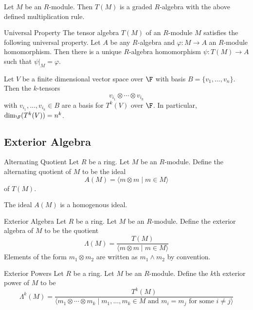 \documentclass[a4paper]{article}
\begin{document}
\begin{prp}{}{} Let $M$ be an $R$-module. Then $T(M)$ is a graded $R$-algebra with the above defined multiplication rule. 
\end{prp}

\begin{prp}{Universal Property}{} The tensor algebra $T(M)$ of an $R$-module $M$ satisfies the following universal property. Let $A$ be any $R$-algebra and $\varphi:M\to A$ an $R$-module homomorphism. Then there is a unique $R$-algebra homomorphism $\psi:T(M)\to A$ such that $\psi|_M=\varphi$. 
\end{prp}

\begin{prp}{}{} Let $V$ be a finite dimensional vector space over $\F$ with basis $B=\{v_1,\dots,v_n\}$. Then the $k$-tensors $$v_{i_1}\otimes\cdots\otimes v_{i_k}$$ with $v_{i_1},\dots,v_{i_k}\in B$ are a basis for $T^k(V)$ over $\F$. In particular, $\dim_\F(T^k(V))=n^k$. 
\end{prp}

\subsection{Exterior Algebra}
\begin{defn}{Alternating Quotient}{} Let $R$ be a ring. Let $M$ be an $R$-module. Define the alternating quotient of $M$ to be the ideal $$A(M)=\langle m\otimes m\;|\;m\in M\rangle$$ of $T(M)$. 
\end{defn}

\begin{lmm}{}{} The ideal $A(M)$ is a homogenous ideal. 
\end{lmm}

\begin{defn}{Exterior Algebra}{} Let $R$ be a ring. Let $M$ be an $R$-module. Define the exterior algebra of $M$ to be the quotient $$\Lambda(M)=\frac{T(M)}{\langle m\otimes m\;|\;m\in M\rangle}$$ Elements of the form $m_1\otimes m_2$ are written as $m_1\wedge m_2$ by convention. 
\end{defn}

\begin{defn}{Exterior Powers}{} Let $R$ be a ring. Let $M$ be an $R$-module. Define the $k$th exterior power of $M$ to be $$\Lambda^k(M)=\frac{T^k(M)}{\langle m_1\otimes\cdots\otimes m_k\;|\;m_1,\dots,m_k\in M\text{ and }m_i=m_j\text{ for some }i\neq j\rangle}$$
\end{defn}
\end{document}

